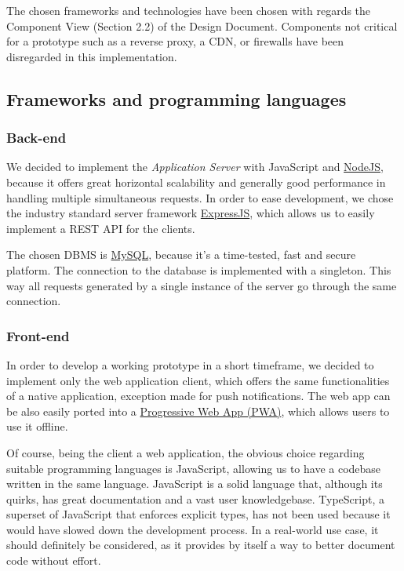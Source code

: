 \documentclass[
]{article}
\begin{document}
The chosen frameworks and technologies have been chosen with regards the
Component View (Section 2.2) of the Design Document. Components not critical for a prototype such as a reverse proxy, a CDN, or firewalls have been disregarded in this implementation.

\hypertarget{frameworks-and-programming-languages}{%
\subsection{Frameworks and programming
languages}\label{frameworks-and-programming-languages}}

\hypertarget{back-end}{%
\subsubsection{Back-end}\label{back-end}}

We decided to implement the \emph{Application Server} with JavaScript
and \href{https://nodejs.org}{NodeJS}, because it offers great
horizontal scalability and generally good performance in handling
multiple simultaneous requests. In order to ease development, we chose
the industry standard server framework
\href{https://expressjs.com/}{ExpressJS}, which allows us to easily
implement a REST API for the clients.

The chosen DBMS is \href{https://www.mysql.com/}{MySQL}, because it's a
time-tested, fast and secure platform. The connection to the database is implemented with a singleton. This way all requests generated by a single instance of the server go through the same connection.

\hypertarget{front-end}{%
\subsubsection{Front-end}\label{front-end}}

In order to develop a working prototype in a short timeframe, we decided
to implement only the web application client, which offers the same
functionalities of a native application, exception made for push
notifications. The web app can be also easily ported into a
\href{https://developer.mozilla.org/en-US/docs/Web/Progressive_web_apps}{Progressive
Web App (PWA)}, which allows users to use it offline.

Of course, being the client a web application, the obvious choice
regarding suitable programming languages is JavaScript, allowing us to
have a codebase written in the same language. JavaScript is a solid language that, although its quirks, has great documentation and a vast user knowledgebase. 
TypeScript, a superset of JavaScript that enforces explicit types, has not been used because it would have slowed down the development process. In a real-world use case, it should definitely be considered, as it provides by itself a way to better document code without effort.
\end{document}
